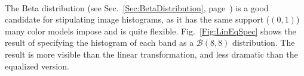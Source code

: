 \begin{figure*}[hbt]
\centering
{}\ 
\ 
\caption{Examples of linearization, equalization and histogram specification of data from an urban area}\label{Fig:LinEqSpec}
\end{figure*}

The Beta distribution (see Sec.~\ref{Sec:BetaDistribution}, page~\pageref{Sec:BetaDistribution}) is a good candidate for stipulating image histograms, as it has the same support ($(0,1)$) many color models impose and is quite flexible.
Fig.~\ref{Fig:LinEqSpec} shows the result of specifying the histogram of each band as a $\mathcal B(8,8)$ distribution.
The result is more visible than the linear transformation, and less dramatic than the equalized version.